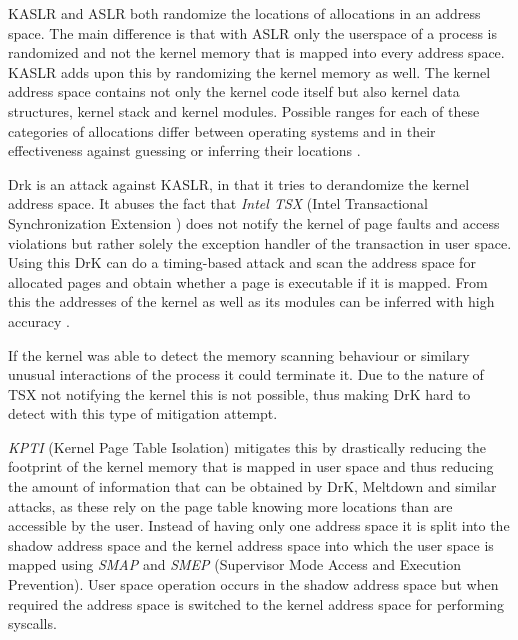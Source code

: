KASLR and ASLR both randomize the locations of allocations in an address space.
The main difference is that with ASLR only the userspace of a process is randomized and not the kernel memory that is mapped into every address space.
KASLR adds upon this by randomizing the kernel memory as well.
The kernel address space contains not only the kernel code itself but also kernel data structures, kernel stack and kernel modules.
Possible ranges for each of these categories of allocations differ between operating systems and in their effectiveness against guessing or inferring their locations \cite{drk}.

Drk is an attack against KASLR, in that it tries to derandomize the kernel address space.\cite{drk}
It abuses the fact that \textit{Intel TSX} (Intel Transactional Synchronization Extension \cite{intel-tsx-overview}) does not notify the kernel of page faults and access violations but rather solely the exception handler of the transaction in user space.
Using this DrK can do a timing-based attack and scan the address space for allocated pages and obtain whether a page is executable if it is mapped.
From this the addresses of the kernel as well as its modules can be inferred with high accuracy \cite{drk}.

If the kernel was able to detect the memory scanning behaviour or similary unusual interactions of the process it could terminate it.
Due to the nature of TSX not notifying the kernel this is not possible, thus making DrK hard to detect with this type of mitigation attempt.

\textit{KPTI} (Kernel Page Table Isolation) mitigates this by drastically reducing the footprint of the kernel memory that is mapped in user space and thus reducing the amount of information that can be obtained by DrK, Meltdown and similar attacks, as these rely on the page table knowing more locations than are accessible by the user.
Instead of having only one address space it is split into the shadow address space and the kernel address space into which the user space is mapped using \textit{SMAP} and \textit{SMEP} (Supervisor Mode Access and Execution Prevention).
User space operation occurs in the shadow address space but when required the address space is switched to the kernel address space for performing syscalls.\cite{kaiser}
